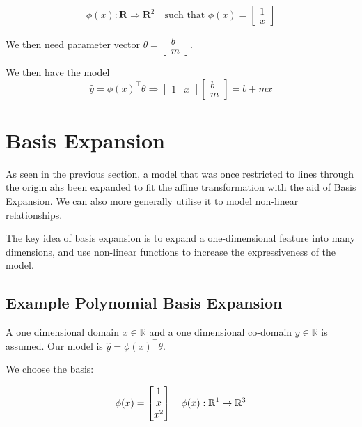 \begin{equation}
    \phi(x) : \mathbf{R} \Rightarrow \mathbf{R}^2 \quad \text{such that } \phi(x) = \begin{bmatrix} 1 \\ x \end{bmatrix}
\end{equation}

\noindent We then need parameter vector $\theta = \begin{bmatrix} b \\ m \end{bmatrix}$.

\noindent We then have the model
\begin{equation}
    \hat{y} = \phi(x)^\top \theta \Rightarrow \begin{bmatrix} 1 & x \end{bmatrix}  \begin{bmatrix} b \\ m \end{bmatrix} = b + mx
\end{equation}

\section{Basis Expansion}
As seen in the previous section, a model that was once restricted to lines through the origin ahs been expanded to fit the affine transformation with the aid of Basis Expansion. We can also more generally utilise it to model non-linear relationships.

\bigskip

The key idea of basis expansion is to expand a one-dimensional feature into many dimensions, and use non-linear functions to increase the expressiveness of the model.

\subsection{Example Polynomial Basis Expansion}
A one dimensional domain $x \in \mathbb{R}$ and a one dimensional co-domain $y \in \mathbb{R}$ is assumed. Our model is $\hat{y} = \phi(x)^\top \theta$. \bigskip


We choose the basis:

\begin{equation}
    \phi(x) = \begin{bmatrix} 1 \\ x \\ x^2 \end{bmatrix} \quad \phi(x) : \mathbb{R}^1 \rightarrow \mathbb{R}^3
\end{equation}

